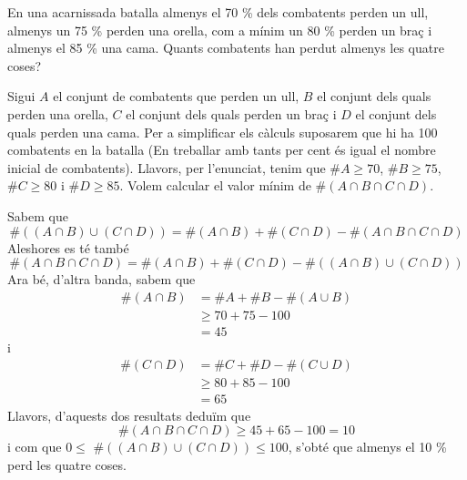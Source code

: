 \begin{exercici}
En una acarnissada batalla almenys el 70 \% dels combatents perden un ull,
almenys un 75 \% perden una orella, com a mínim un 80 \% perden un braç i almenys el 85 \% una cama. Quants combatents han perdut almenys les
quatre coses?
\end{exercici}

\begin{solucio}
Sigui $A$ el conjunt de combatents que perden un ull, $B$ el conjunt dels
quals perden una orella, $C$ el conjunt dels quals perden un braç i $D$
el conjunt dels quals perden una cama. Per a simplificar els càlculs
suposarem que hi ha 100 combatents en la batalla (En treballar amb tants per
cent és igual el nombre inicial de combatents). Llavors, per l'enunciat,
tenim que $\#A\geq 70$, $\#B\geq 75$, $\#C\geq 80$ i $\#D\geq 85$. Volem
calcular el valor mínim de $\#\left( A\cap B\cap C\cap D\right) $.

Sabem que%
\begin{equation*}
\#\left( \left( A\cap B\right) \cup \left( C\cap D\right) \right) =\#\left(
A\cap B\right) +\#\left( C\cap D\right) -\#\left( A\cap B\cap C\cap D\right)
\end{equation*}%
Aleshores es té també%
\begin{equation*}
\#\left( A\cap B\cap C\cap D\right) =\#\left( A\cap B\right) +\#\left( C\cap
D\right) -\#\left( \left( A\cap B\right) \cup \left( C\cap D\right) \right)
\end{equation*}%
Ara bé, d'altra banda, sabem que%
\begin{align*}
\#\left( A\cap B\right) & =\#A+\#B-\#\left( A\cup B\right) \\
& \geq 70+75-100 \\
& =45
\end{align*}%
i%
\begin{align*}
\#\left( C\cap D\right) & =\#C+\#D-\#\left( C\cup D\right) \\
& \geq 80+85-100 \\
& =65
\end{align*}%
Llavors, d'aquests dos resultats deduïm que%
\begin{equation*}
\#\left( A\cap B\cap C\cap D\right) \geq 45+65-100=10
\end{equation*}%
i com que $0\leq $ $\#\left( \left( A\cap B\right) \cup \left( C\cap
D\right) \right) \leq 100$, s'obté que almenys el 10 \% perd les quatre
coses.
\end{solucio}

